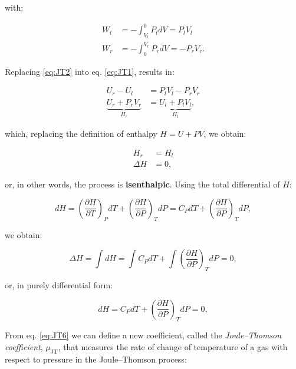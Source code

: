 \documentclass[
  9pt,
]{extbook}
\theoremstyle{definition}
\theoremstyle{definition}
\theoremstyle{definition}
\theoremstyle{remark}
\begin{document}
with:

\begin{equation}
\begin{aligned}
W_l &=-\int_{V_l}^0 P_l dV = P_l V_l\\
W_r &=-\int_0^{V_r} P_r dV = - P_r V_r.
\end{aligned}
\label{eq:JT2}
\end{equation}

Replacing \eqref{eq:JT2} into eq. \eqref{eq:JT1}, results in:

\begin{equation}
\begin{aligned}
U_r-U_l &=P_l V_l-P_r V_r \\
\underbrace{U_r+P_r V_r}_{H_r} &= \underbrace{U_l + P_l V_l}_{H_l},
\end{aligned}
\label{eq:JT3}
\end{equation}

which, replacing the definition of enthalpy \(H=U+PV\), we obtain:

\begin{equation}
\begin{aligned}
H_r &=H_l \\
\Delta H &=0,
\end{aligned}
\label{eq:JT4}
\end{equation}

or, in other words, the process is \textbf{isenthalpic}. Using the total differential of \(H\):

\begin{equation}
dH=\left(\frac{\partial H}{\partial T} \right)_P dT + \left(\frac{\partial H}{\partial P} \right)_T dP = C_P dT + \left(\frac{\partial H}{\partial P} \right)_T dP,
\label{eq:JT5}
\end{equation}

we obtain:

\begin{equation}
\Delta H=\int dH = \int C_P dT + \int \left(\frac{\partial H}{\partial P} \right)_T dP =0,
\label{eq:JT6b}
\end{equation}

or, in purely differential form:

\begin{equation}
dH = C_P dT + \left(\frac{\partial H}{\partial P} \right)_T dP =0,
\label{eq:JT6}
\end{equation}

From eq. \eqref{eq:JT6} we can define a new coefficient, called the \emph{Joule--Thomson coefficient}, \(\mu_{\mathrm{JT}}\), that measures the rate of change of temperature of a gas with respect to pressure in the Joule--Thomson process:
\end{document}

